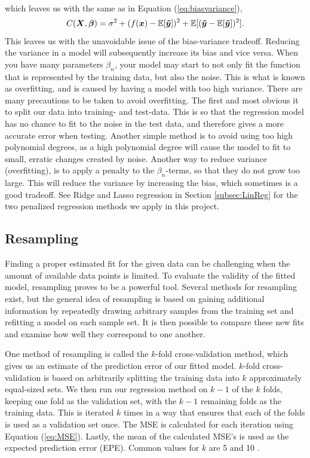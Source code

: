 \documentclass[a4paper, 10pt]{article}
\begin{document}
\begin{multicols}{2}
\begin{align*}
\end{align*}
which leaves us with the same as in Equation (\ref{eq:biasvariance}),
\begin{equation*}
C(\bm{X},\bm{\beta} ) =  \sigma^2 +  ( f(\bm{x}) -\mathbb{E}[\bm{\tilde{y}}]  )^2  +\mathbb{E}[(\bm{\tilde{y}} -\mathbb{E}[\bm{\tilde{y}}])^2]. \\
\end{equation*}
This leaves us with the unavoidable issue of the bias-variance tradeoff. Reducing the variance in a model will subsequently increase its bias and vice versa.
When you have many parameters $\beta_n$, your model may start to not only fit the function that is represented by the training data, but also the noise. This is what is known as overfitting, and is caused by having a model with too high variance. There are many precautions to be taken to avoid overfitting. The first and most obvious it to split our data into training- and test-data. This is so that the regression model has no chance to fit to the noise in the test data, and therefore gives a more accurate error when testing. Another simple method is to avoid using too high polynomial degrees, as a high polynomial degree will cause the model to fit to small, erratic changes created by noise.
Another way to reduce variance (overfitting), is to apply a penalty to the $\beta_n$-terms, so that they do not grow too large. This will reduce the variance by increasing the bias, which sometimes is a good tradeoff. See Ridge and Lasso regression in Section \ref{subsec:LinReg} for the two penalized regression methods we apply in this project.

\subsection{Resampling}
Finding a proper estimated fit for the given data can be challenging when the amount of available data points is limited. To evaluate the validity of the fitted model, resampling proves to be a powerful tool. Several methods for resampling exist, but the general idea of resampling is based on gaining additional information by repeatedly drawing arbitrary samples from the training set and refitting a model on each sample set. It is then possible to compare these new fits and examine how well they correspond to one another.

One method of resampling is called the $k$-fold cross-validation method, which gives us an estimate of the prediction error of our fitted model. $k$-fold cross-validation is based on arbitrarily splitting the training data into $k$ approximately equal-sized sets.  We then run our regression method on $k-1$ of the $k$ folds, keeping one fold as the validation set, with the $k-1$ remaining folds as the training data. This is iterated $k$ times in a way that ensures that each of the folds is used as a validation set once. The MSE is calculated for each iteration using Equation (\ref{eq:MSE}). Lastly, the mean of the calculated MSE's is used as the expected prediction error (EPE).  Common values for $k$ are 5 and 10 \cite{hastie}.



\end{multicols}
\end{document}
